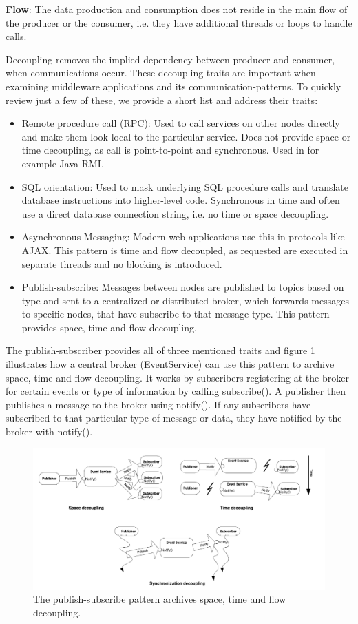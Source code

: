 \textbf{Flow}: The data production and consumption does not reside in the main flow of the producer or the consumer, i.e. they have additional threads or loops to handle calls.

Decoupling removes the implied dependency between producer and consumer, when communications occur. These decoupling traits are important when examining middleware applications and its communication-patterns. To quickly review just a few of these, we provide a short list and address their traits:

\begin{itemize}
	\item Remote procedure call (RPC): Used to call services on other nodes directly and make them look local to the particular service. Does not provide space or time decoupling, as call is point-to-point and synchronous. Used in for example Java RMI.
	\item SQL orientation: Used to mask underlying SQL procedure calls and translate database instructions into higher-level code. Synchronous in time and often use a direct database connection string, i.e. no time or space decoupling.
	\item Asynchronous Messaging: Modern web applications use this in protocols like AJAX. This pattern is time and flow decoupled, as requested are executed in separate threads and no blocking is introduced.
	\item Publish-subscribe: Messages between nodes are published to topics based on type and sent to a centralized or distributed broker, which forwards messages to specific nodes, that have subscribe to that message type. This pattern provides space, time and flow decoupling.
\end{itemize}

The publish-subscriber provides all of three mentioned traits and figure \ref{fig:pubsub} illustrates how a central broker (EventService) can use this pattern to archive space, time and flow decoupling. It works by subscribers registering at the broker for certain events or type of information by calling subscribe(). A publisher then publishes a message to the broker using notify(). If any subscribers have subscribed to that particular type of message or data, they have notified by the broker with notify().

\begin{figure}[h!]\label{}
	\centering
	\includegraphics[scale=0.5]{middleware/pubsub.png}
	\caption{The publish-subscribe pattern archives space, time and flow decoupling.}
	\label{fig:pubsub}
\end{figure}


